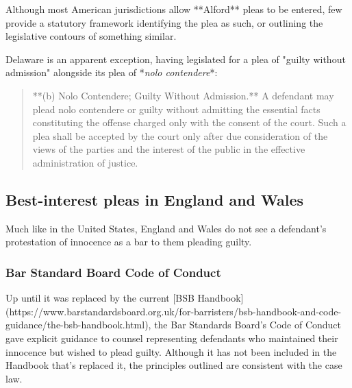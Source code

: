 Although most American jurisdictions allow **Alford** pleas to be entered, few provide a statutory framework identifying the plea as such, or outlining the legislative contours of something similar.

Delaware is an apparent exception, having legislated for a plea of "guilty without admission" alongside its plea of *\textit{nolo contendere}*:
\begin{quote}
    **(b) Nolo Contendere; Guilty Without Admission.** A defendant may plead nolo contendere or guilty without admitting the essential facts constituting the offense charged only with the consent of the court. Such a plea shall be accepted by the court only after due consideration of the views of the parties and the interest of the public in the effective administration of justice.
\end{quote}

\subsection{Best-interest pleas in England and Wales}

Much like in the United States, England and Wales do not see a defendant's protestation of innocence as a bar to them pleading guilty.

\subsubsection{Bar Standard Board Code of Conduct}

Up until it was replaced by the current [BSB Handbook](https://www.barstandardsboard.org.uk/for-barristers/bsb-handbook-and-code-guidance/the-bsb-handbook.html), the Bar Standards Board's Code of Conduct gave explicit guidance to counsel representing defendants who maintained their innocence but wished to plead guilty. Although it has not been included in the Handbook that's replaced it, the principles outlined are consistent with the case law.

